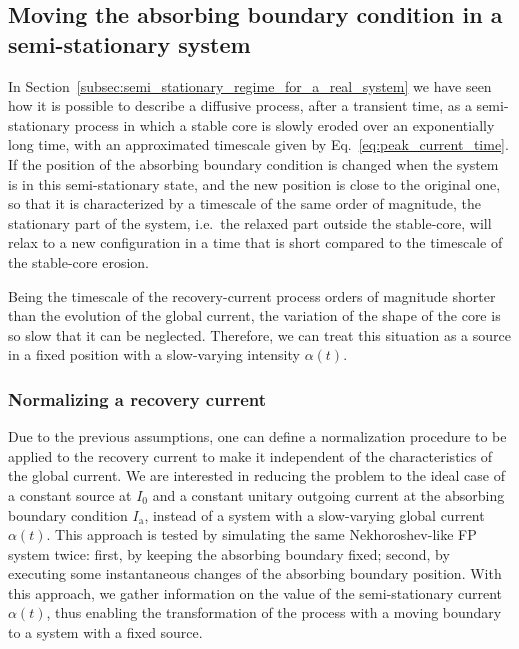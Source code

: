 {%

\subsection{Moving the absorbing boundary condition in a semi-stationary system}
\label{subsec:Moving_the_boundary_in_a_semi_stationary_system}


In Section~\ref{subsec:semi_stationary_regime_for_a_real_system} we have seen how it is possible to describe a diffusive process, after a transient time, as a semi-stationary process in which a stable core is slowly eroded over an exponentially long time, with an approximated timescale given by Eq.~\eqref{eq:peak_current_time}. If the position of the absorbing boundary condition is changed when the system is in this semi-stationary state, and the new position is close to the original one, so that it is characterized by a timescale of the same order of magnitude, the stationary part of the system, i.e.\ the relaxed part outside the stable-core, will relax to a new configuration in a time that is short compared to the timescale of the stable-core erosion.

Being the timescale of the recovery-current process orders of magnitude shorter than the evolution of the global current, the variation of the shape of the core is so slow that it can be neglected. Therefore, we can treat this situation as a source in a fixed position with a slow-varying intensity $\alpha(t)$. 


\subsubsection{Normalizing a recovery current}


Due to the previous assumptions, one can define a normalization procedure to be applied to the recovery current to make it independent of the characteristics of the global current. We are interested in reducing the problem to the ideal case of a constant source at $I_0$ and a constant unitary outgoing current at the absorbing boundary condition $I_\mathrm{a}$, instead of a system with a slow-varying global current $\alpha(t)$. This approach is tested by simulating the same Nekhoroshev-like FP system twice: first, by keeping the absorbing boundary fixed; second, by executing some instantaneous changes of the absorbing boundary position. With this approach, we gather information on the value of the semi-stationary current $\alpha(t)$, thus enabling the transformation of the process with a moving boundary to a system with a fixed source.

}
